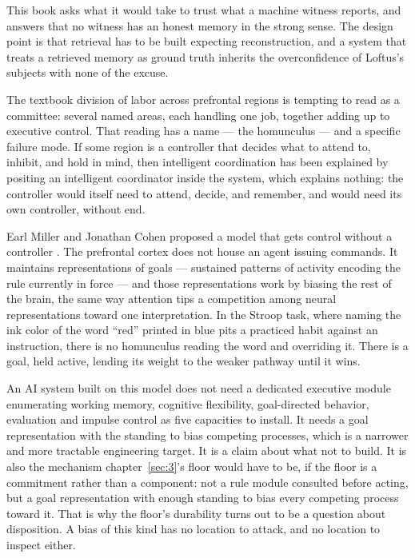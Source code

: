 This book asks what it would take to trust what a machine witness reports, and answers that no witness has an honest memory in the strong sense. The design point is that retrieval has to be built expecting reconstruction, and a system that treats a retrieved memory as ground truth inherits the overconfidence of Loftus's subjects with none of the excuse.

The textbook division of labor across prefrontal regions is tempting to read as a committee: several named areas, each handling one job, together adding up to executive control. That reading has a name — the homunculus — and a specific failure mode. If some region is a controller that decides what to attend to, inhibit, and hold in mind, then intelligent coordination has been explained by positing an intelligent coordinator inside the system, which explains nothing: the controller would itself need to attend, decide, and remember, and would need its own controller, without end.

Earl Miller and Jonathan Cohen proposed a model that gets control without a controller \autocite{miller2001integrative}. The prefrontal cortex does not house an agent issuing commands. It maintains representations of goals — sustained patterns of activity encoding the rule currently in force — and those representations work by biasing the rest of the brain, the same way attention tips a competition among neural representations toward one interpretation. In the Stroop task, where naming the ink color of the word “red” printed in blue pits a practiced habit against an instruction, there is no homunculus reading the word and overriding it. There is a goal, held active, lending its weight to the weaker pathway until it wins.

An AI system built on this model does not need a dedicated executive module enumerating working memory, cognitive flexibility, goal-directed behavior, evaluation and impulse control as five capacities to install. It needs a goal representation with the standing to bias competing processes, which is a narrower and more tractable engineering target. It is a claim about what not to build. It is also the mechanism chapter~\ref{sec:3}'s floor would have to be, if the floor is a commitment rather than a component: not a rule module consulted before acting, but a goal representation with enough standing to bias every competing process toward it. That is why the floor's durability turns out to be a question about disposition. A bias of this kind has no location to attack, and no location to inspect either.

